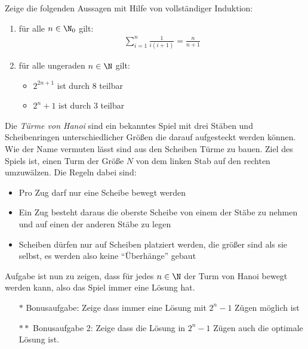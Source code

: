 \begin{exercise}
  Zeige die folgenden Aussagen mit Hilfe von vollständiger Induktion:
  \begin{enumerate}
  \item für alle $n \in \N_0$ gilt:
    \begin{equation*}
      \begin{split}
        \sum\limits_{ i=1 }^{ n}{ \frac{1}{i(i+1)} } = \frac{n}{n+1}
      \end{split}
    \end{equation*}
  \item für alle ungeraden $n \in \N$ gilt:
    \begin{itemize}
    \item $2^{2n + 1}$ ist durch $8$ teilbar
    \item $2^{n} + 1$ ist durch $3$ teilbar
    \end{itemize}
  \end{enumerate}
\end{exercise}

\begin{exercise}
  Die \emph{Türme von Hanoi} sind ein bekanntes Spiel mit drei Stäben und
  Scheibenringen unterschiedlicher Größen die darauf aufgesteckt werden können.
  Wie der Name vermuten lässt sind aus den Scheiben Türme zu bauen. Ziel des
  Spiels ist, einen Turm der Größe $N$ von dem linken Stab auf den rechten
  umzuwälzen. Die Regeln dabei sind:
  \begin{itemize}
  \item Pro Zug darf nur eine Scheibe bewegt werden
  \item Ein Zug besteht daraus die oberste Scheibe von einem der Stäbe zu nehmen
    und auf einen der anderen Stäbe zu legen
  \item Scheiben dürfen nur auf Scheiben platziert werden, die größer sind als
    sie selbst, es werden also keine \enquote{Überhänge} gebaut
  \end{itemize}
  Aufgabe ist nun zu zeigen, dass für jedes $n \in \N$ der Turm von Hanoi bewegt
  werden kann, also das Spiel immer eine Lösung hat.
  \begin{itemize}
  \item[$\ast$] Bonusaufgabe: Zeige dass immer eine Lösung mit $2^n - 1$ Zügen
    möglich ist
  \item[$\ast\ast$] Bonusaufgabe 2: Zeige dass die Lösung in $2^n - 1$ Zügen auch
    die optimale Lösung ist.
  \end{itemize}
\end{exercise}

